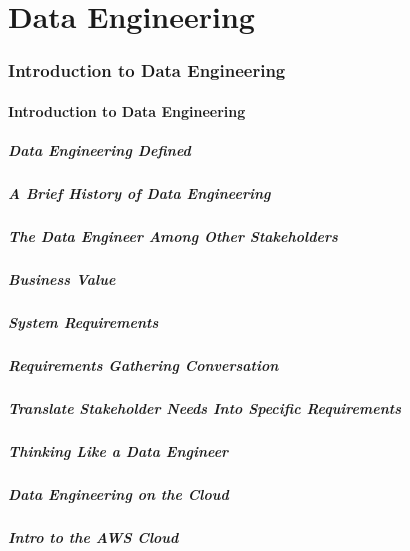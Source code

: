 \part{Data Engineering}

\section{Introduction to Data Engineering}
\subsection{Introduction to Data Engineering}
\subsubsection{Data Engineering Defined}
\subsubsection{A Brief History of Data Engineering}
\subsubsection{The Data Engineer Among Other Stakeholders}
\subsubsection{Business Value}
\subsubsection{System Requirements}
\subsubsection{Requirements Gathering Conversation}
\subsubsection{Translate Stakeholder Needs Into Specific Requirements}
\subsubsection{Thinking Like a Data Engineer}
\subsubsection{Data Engineering on the Cloud}
\subsubsection{Intro to the AWS Cloud}
